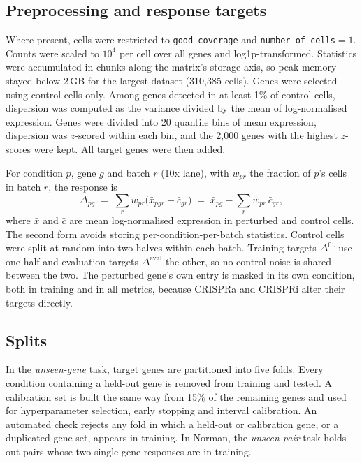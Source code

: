 \subsection{Preprocessing and response targets}
Where present, cells were restricted to \texttt{good\_coverage} and \texttt{number\_of\_cells}$=1$. Counts were scaled to $10^4$ per cell over all genes and log1p-transformed. Statistics were accumulated in chunks along the matrix's storage axis, so peak memory stayed below 2\,GB for the largest dataset (310{,}385 cells). Genes were selected using control cells only. Among genes detected in at least 1\% of control cells, dispersion was computed as the variance divided by the mean of log-normalised expression. Genes were divided into 20 quantile bins of mean expression, dispersion was $z$-scored within each bin, and the 2{,}000 genes with the highest $z$-scores were kept. All target genes were then added.

For condition $p$, gene $g$ and batch $r$ (10x lane), with $w_{pr}$ the fraction of $p$'s cells in batch $r$, the response is
\begin{equation}
\Delta_{pg} \;=\; \sum_r w_{pr}\big(\bar x_{pgr} - \bar c_{gr}\big) \;=\; \bar x_{pg} - \sum_r w_{pr}\,\bar c_{gr},
\end{equation}
where $\bar x$ and $\bar c$ are mean log-normalised expression in perturbed and control cells. The second form avoids storing per-condition-per-batch statistics. Control cells were split at random into two halves within each batch. Training targets $\Delta^{\mathrm{fit}}$ use one half and evaluation targets $\Delta^{\mathrm{eval}}$ the other, so no control noise is shared between the two. The perturbed gene's own entry is masked in its own condition, both in training and in all metrics, because CRISPRa and CRISPRi alter their targets directly.

\subsection{Splits}
In the \emph{unseen-gene} task, target genes are partitioned into five folds. Every condition containing a held-out gene is removed from training and tested. A calibration set is built the same way from 15\% of the remaining genes and used for hyperparameter selection, early stopping and interval calibration. An automated check rejects any fold in which a held-out or calibration gene, or a duplicated gene set, appears in training. In Norman, the \emph{unseen-pair} task holds out pairs whose two single-gene responses are in training.

